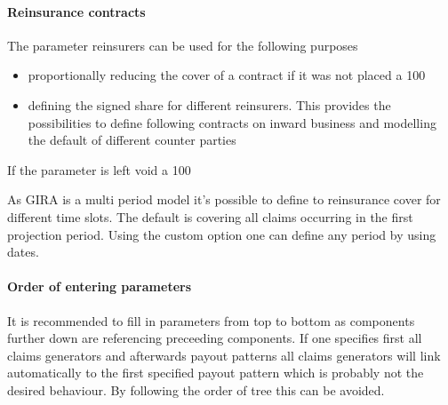 \paragraph{Reinsurance contracts}
The parameter reinsurers can be used for the following purposes
\begin{itemize}
\item proportionally reducing the cover of a contract if it was not placed a 100%
\item defining the signed share for different reinsurers. This provides the possibilities to define following contracts on inward business and modelling the default of different counter parties
\end{itemize}
If the parameter is left void a 100%

As GIRA is a multi period model it's possible to define to reinsurance cover for different time slots. The default is covering all claims occurring in the first projection period. Using the custom option one can define any period by using dates.

\paragraph{Order of entering parameters}
It is recommended to fill in parameters from top to bottom as components further down are referencing preceeding components. If one specifies first all claims generators and afterwards payout patterns all claims generators will link automatically to the first specified payout pattern which is probably not the desired behaviour. By following the order of tree this can be avoided.